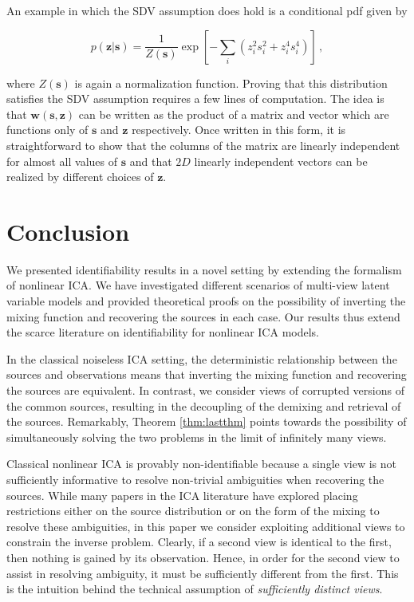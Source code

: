 An example in which the SDV assumption does hold is a conditional pdf given by

\begin{equation}
p(\bm{z}|\bm{s}) = \frac{1}{Z(\bm{s})} \exp \left[ - \sum_i (z_i^2  s_i^2 + z_i^4 s_i^4  ) \right]\,, \label{eq:satisfied}
\end{equation}

where $Z(\bm{s})$ is again a normalization function.
Proving that this distribution satisfies the SDV assumption requires a few lines of computation.
The idea is that $\bm{w}(\bm{s}, \bm{z})$ can be written as the product of a matrix and vector which are functions only of $\bm{s}$ and $\bm{z}$ respectively.
Once written in this form, it is straightforward to show that the columns of the matrix are linearly independent for almost all values of $\bm{s}$ and that $2D$ linearly independent vectors can be realized by different choices of $\bm{z}$.


\section{Conclusion}
\label{sec:on_suffistv}
We presented identifiability results in a novel setting by extending the formalism of nonlinear ICA.
We have investigated different scenarios of multi-view latent variable models and provided theoretical proofs on the possibility of inverting the mixing function and recovering the sources in each case.
Our results thus extend the scarce literature on identifiability for nonlinear ICA models.

In the classical noiseless ICA setting, the deterministic relationship between the sources and observations means that inverting the mixing function and recovering the sources are equivalent.
In contrast, we consider views of corrupted versions of the common sources, resulting in the decoupling of the demixing and retrieval of the sources.
Remarkably, Theorem \ref{thm:lastthm} points towards the possibility of simultaneously solving the two problems in the limit of infinitely many views.

Classical nonlinear ICA is provably non-identifiable because a single view is not sufficiently informative to resolve non-trivial ambiguities when recovering the sources.
While many papers in the ICA literature have explored placing restrictions either on the source distribution or on the form of the mixing to resolve these ambiguities, in this paper we consider exploiting additional views to constrain the inverse problem.
Clearly, if a second view is identical to the first, then nothing is gained by its observation.
Hence, in order for the second view to assist in resolving ambiguity, it must be sufficiently different from the first.
This is the intuition behind the technical assumption of \emph{sufficiently distinct views}.


